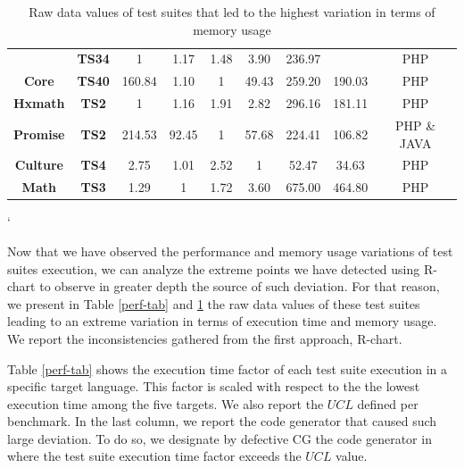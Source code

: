 \begin{table}[h]
{\begin{tabular}{|c|c|c|c|c|c|c|c|c|}
			& \textbf{TS34}       & 1                              & 1.17        & 1.48         & 3.90        & \cellcolor[HTML]{E8E8E8}236.97       &                          & PHP                   \\ \cline{2-7} \cline{9-9} 
			\multirow{-8}{*}{\textbf{Core}}  & \textbf{TS40}       & 160.84                         & 1.10        & 1            & 49.43       & \cellcolor[HTML]{E8E8E8}259.20       & \multirow{-8}{*}{190.03} & PHP                   \\ \hline
			\textbf{Hxmath}                  & \textbf{TS2}        & 1                              & 1.16        & 1.91         & 2.82        & \cellcolor[HTML]{E8E8E8}296.16       & 181.11                   & PHP                   \\ \hline
			\textbf{Promise}                 & \textbf{TS2}        & \cellcolor[HTML]{E8E8E8}214.53 & 92.45       & 1            & 57.68       & \cellcolor[HTML]{E8E8E8}224.41       & 106.82                   & PHP \& JAVA           \\ \hline
			\textbf{Culture}                 & \textbf{TS4}        & 2.75                           & 1.01        & 2.52         & 1           & \cellcolor[HTML]{E8E8E8}52.47        & 34.63                    & PHP                   \\ \hline
			\textbf{Math}                    & \textbf{TS3}        & 1.29                           & 1           & 1.72         & 3.60        & \cellcolor[HTML]{E8E8E8}675.00       & 464.80                   & PHP                   \\ \hline
		\end{tabular}%
	}
	\caption{Raw data values of test suites that led to the highest variation in terms of memory usage}
	\label{mem-tab}`
\end{table}

Now that we have observed the performance and memory usage variations of test suites execution, we can analyze the extreme points we have detected using R-chart to observe in greater depth the source of such deviation.
For that reason, we present in Table \ref{perf-tab} and \ref{mem-tab} the raw data values of these test suites leading to an extreme variation in terms of execution time and memory usage. We report the inconsistencies gathered from the first approach, R-chart.

Table \ref{perf-tab} shows the execution time factor of each test suite execution in a specific target language. This factor is scaled with respect to the the lowest execution time among the five targets. We also report the $UCL$ defined per benchmark. In the last column, we report the code generator that caused such large deviation. To do so, we designate by defective CG the code generator in where the test suite execution time factor exceeds the $UCL$ value.

